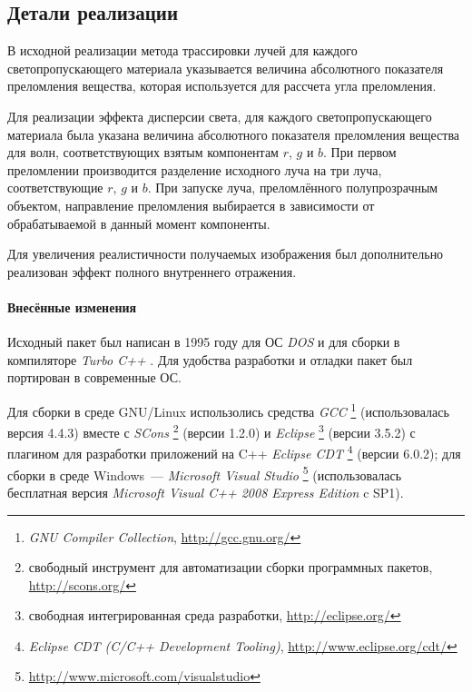 \documentclass[a4paper,10pt]{article}
\begin{document}
\subsection{Детали реализации}
В исходной реализации метода трассировки лучей для каждого светопропускающего материала указывается 
величина абсолютного показателя преломления вещества, которая используется для рассчета угла преломления.

Для реализации эффекта дисперсии света, 
для каждого светопропускающего материала была указана величина абсолютного показателя преломления вещества для волн,
соответствующих взятым компонентам $r$, $g$ и $b$.
При первом преломлении производится разделение исходного луча на три луча, соответствующие $r$, $g$ и $b$.
При запуске луча, преломлённого полупрозрачным объектом, 
направление преломления выбирается в зависимости от обрабатываемой в данный момент компоненты.

Для увеличения реалистичности получаемых изображения был дополнительно реализован 
эффект полного внутреннего отражения.

\paragraph{Внесённые изменения}
Исходный пакет был написан в 1995 году для ОС \textit{DOS} и для сборки в компиляторе \textit{Turbo C++}%
.
Для удобства разработки и отладки пакет был портирован в современные ОС.

Для сборки в среде GNU/Linux использолись средства \textit{GCC}%
\footnote{\textit{GNU Compiler Collection}, \url{http://gcc.gnu.org/}} 
(использовалась версия 4.4.3) вместе с \textit{SCons}%
\footnote{свободный инструмент для автоматизации сборки программных пакетов, \url{http://scons.org/}} 
(версии 1.2.0) и
\textit{Eclipse}%
\footnote{свободная интегрированная среда разработки, \url{http://eclipse.org/}} 
(версии 3.5.2) с плагином для разработки приложений на C++ \textit{Eclipse CDT}%
\footnote{\textit{Eclipse CDT (C/C++ Development Tooling)}, \url{http://www.eclipse.org/cdt/}}
(версии 6.0.2);
для сборки в среде Windows~--- \textit{Microsoft Visual Studio}%
\footnote{\url{http://www.microsoft.com/visualstudio}}
(использовалась бесплатная версия \textit{Microsoft Visual C++ 2008 Express Edition} c SP1).
\end{document}
